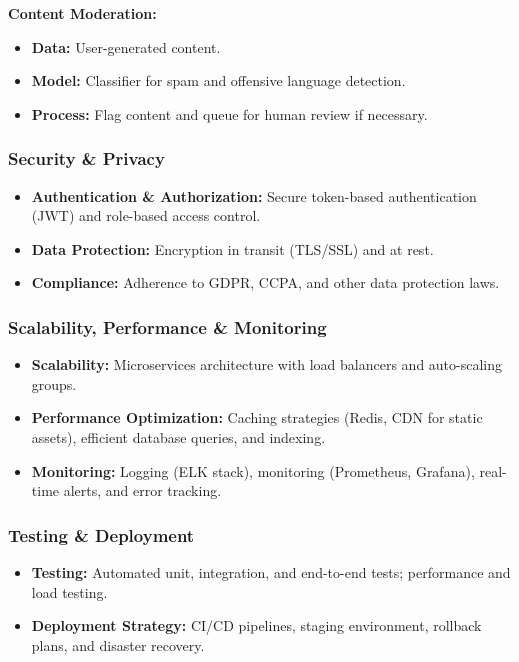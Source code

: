 \documentclass[11pt]{article}
\begin{document}
\textbf{Content Moderation:}
\begin{itemize}[noitemsep]
    \item \textbf{Data:} User-generated content.
    \item \textbf{Model:} Classifier for spam and offensive language detection.
    \item \textbf{Process:} Flag content and queue for human review if necessary.
\end{itemize}

\subsubsection{Security \& Privacy}
\begin{itemize}[noitemsep]
    \item \textbf{Authentication \& Authorization:} Secure token-based authentication (JWT) and role-based access control.
    \item \textbf{Data Protection:} Encryption in transit (TLS/SSL) and at rest.
    \item \textbf{Compliance:} Adherence to GDPR, CCPA, and other data protection laws.
\end{itemize}

\subsubsection{Scalability, Performance \& Monitoring}
\begin{itemize}[noitemsep]
    \item \textbf{Scalability:} Microservices architecture with load balancers and auto-scaling groups.
    \item \textbf{Performance Optimization:} Caching strategies (Redis, CDN for static assets), efficient database queries, and indexing.
    \item \textbf{Monitoring:} Logging (ELK stack), monitoring (Prometheus, Grafana), real-time alerts, and error tracking.
\end{itemize}

\subsubsection{Testing \& Deployment}
\begin{itemize}[noitemsep]
    \item \textbf{Testing:} Automated unit, integration, and end-to-end tests; performance and load testing.
    \item \textbf{Deployment Strategy:} CI/CD pipelines, staging environment, rollback plans, and disaster recovery.
\end{itemize}
\end{document}
